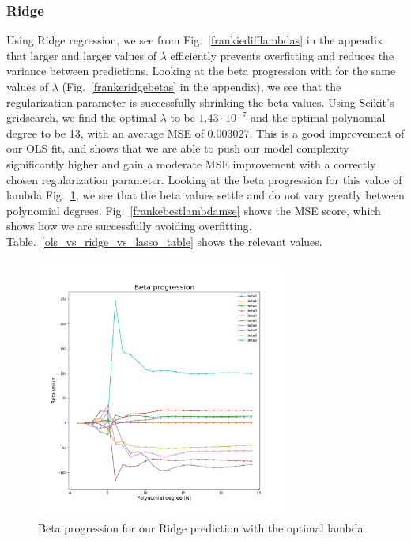 \documentclass[twocolumn,10pt,cleanfoot]{asme2ej}
\begin{document}
\subsubsection{Ridge}

Using Ridge regression, we see from Fig.~\ref{frankiedifflambdas} in the appendix that larger and larger values of $\lambda$ efficiently prevents overfitting and reduces the variance between predictions. Looking at the beta progression with for the same values of $\lambda$ (Fig.~\ref{frankeridgebetas} in the appendix), we see that the regularization parameter is successfully shrinking the beta values. Using Scikit's gridsearch, we find the optimal $\lambda$ to be $1.43 \cdot 10^{-7}$ and the optimal polynomial degree to be 13, with an average MSE of $0.003027$. This is a good improvement of our OLS fit, and shows that we are able to push our model complexity significantly higher and gain a moderate MSE improvement with a correctly chosen regularization parameter. Looking at the beta progression for this value of lambda Fig.~\ref{frankebestlambdabetas}, we see that the beta values settle and do not vary greatly between polynomial degrees. Fig.~\ref{frankebestlambdamse} shows the MSE score, which shows how we are successfully avoiding overfitting. Table.~\ref{ols_vs_ridge_vs_lasso_table} shows the relevant values.

\begin{figure}[h]
\centerline{\includegraphics[width=3.25in]{figure/frankebestlambdabetas.png}}
\caption{Beta progression for our Ridge prediction with the optimal lambda}
\label{frankebestlambdabetas}
\end{figure}
\end{document}
